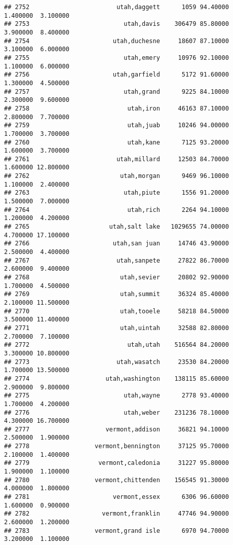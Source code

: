 \documentclass[
]{article}
\begin{document}
\begin{verbatim}
## 2752                        utah,daggett      1059 94.40000  1.400000  3.100000
## 2753                          utah,davis    306479 85.80000  3.900000  8.400000
## 2754                       utah,duchesne     18607 87.10000  3.100000  6.000000
## 2755                          utah,emery     10976 92.10000  1.100000  6.000000
## 2756                       utah,garfield      5172 91.60000  1.300000  4.500000
## 2757                          utah,grand      9225 84.10000  2.300000  9.600000
## 2758                           utah,iron     46163 87.10000  2.800000  7.700000
## 2759                           utah,juab     10246 94.00000  1.700000  3.700000
## 2760                           utah,kane      7125 93.20000  1.600000  3.700000
## 2761                        utah,millard     12503 84.70000  1.600000 12.800000
## 2762                         utah,morgan      9469 96.10000  1.100000  2.400000
## 2763                          utah,piute      1556 91.20000  1.500000  7.000000
## 2764                           utah,rich      2264 94.10000  1.200000  4.200000
## 2765                      utah,salt lake   1029655 74.00000  4.700000 17.100000
## 2766                       utah,san juan     14746 43.90000  2.500000  4.400000
## 2767                        utah,sanpete     27822 86.70000  2.600000  9.400000
## 2768                         utah,sevier     20802 92.90000  1.700000  4.500000
## 2769                         utah,summit     36324 85.40000  2.100000 11.500000
## 2770                         utah,tooele     58218 84.50000  3.500000 11.400000
## 2771                         utah,uintah     32588 82.80000  2.700000  7.100000
## 2772                           utah,utah    516564 84.20000  3.300000 10.800000
## 2773                        utah,wasatch     23530 84.20000  1.700000 13.500000
## 2774                     utah,washington    138115 85.60000  2.900000  9.800000
## 2775                          utah,wayne      2778 93.40000  1.700000  4.200000
## 2776                          utah,weber    231236 78.10000  4.300000 16.700000
## 2777                     vermont,addison     36821 94.10000  2.500000  1.900000
## 2778                  vermont,bennington     37125 95.70000  2.100000  1.400000
## 2779                   vermont,caledonia     31227 95.80000  1.900000  1.100000
## 2780                  vermont,chittenden    156545 91.30000  4.000000  1.800000
## 2781                       vermont,essex      6306 96.60000  1.600000  0.900000
## 2782                    vermont,franklin     47746 94.90000  2.600000  1.200000
## 2783                  vermont,grand isle      6970 94.70000  3.200000  1.100000

\end{verbatim}
\end{document}
